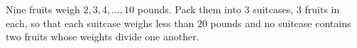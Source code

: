 Nine fruits weigh $2,3,4,\dots,10$ pounds. Pack them into $3$ suitcases, $3$ fruits in each, so that each suitcase weighs less than $20$ pounds and no suitcase contains two fruits whose weights divide one another.
